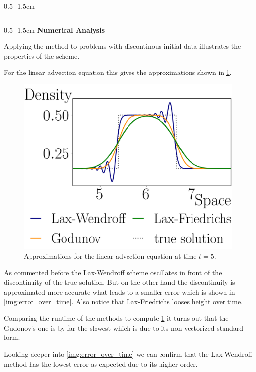 \documentclass{uibposter}
\begin{document}
\begin{frame}[fragile]
\begin{columns}
\begin{column}{0.5\textwidth - 1.5cm}
\begin{column}{0.5\textwidth - 1.5cm}
\vspace{0.5cm}
\textbf{Numerical Analysis}
\vspace{0.5cm}
    
Applying the method to problems with discontinous initial data illustrates the properties of the scheme.

\vspace{0.5cm}
For the linear advection equation this gives the approximations shown in \cref{img:linar_comprehension}. 

\begin{figure}[h]
	\includegraphics{fig/linear_compare.png}
	\caption{Approximations for the linear advection equation at time $t = 5$.}
	\label{img:linar_comprehension}
\end{figure}

As commented before the Lax-Wendroff scheme oscillates in front of the discontinuity of the true solution. But on the other hand the discontinuity is approximated more accurate what leads to a smaller error which is shown in \cref{img:error_over_time}. Also notice that Lax-Friedrichs looses height over time. 

\vspace{0.5cm}
Comparing the runtime of the methods to compute \cref{img:linar_comprehension} it turns out that the Gudonov's one is by far the slowest which is due to its non-vectorized standard form.

\vspace{0.5cm}
Looking deeper into \cref{img:error_over_time} we can confirm that the Lax-Wendroff method has the lowest error as expected due to its higher order.


\end{column}
\end{column}
\end{columns}
\end{frame}
\end{document}
